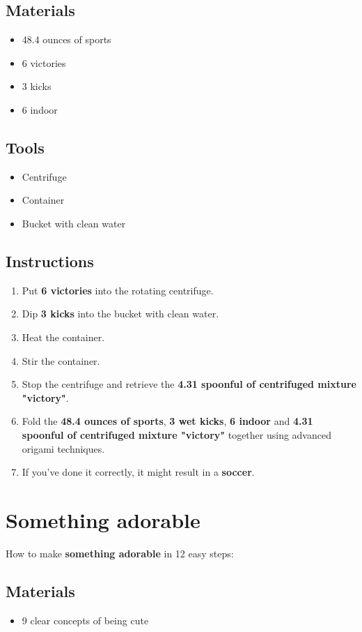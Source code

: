 \documentclass{article}
\begin{document}
\subsection{Materials}\begin{itemize}
\item 
48.4 ounces of sports
\item 
6 victories
\item 
3 kicks
\item 
6 indoor
\end{itemize}
\subsection{Tools}\begin{itemize}
\item 
Centrifuge
\item 
Container
\item 
Bucket with clean water
\end{itemize}
\subsection{Instructions}\begin{enumerate}
\item 
Put \textbf{6 victories} into the rotating centrifuge.
\item 
Dip \textbf{3 kicks} into the bucket with clean water.
\item 
Heat the container.
\item 
Stir the container.
\item 
Stop the centrifuge and retrieve the \textbf{4.31 spoonful of centrifuged mixture "victory"}.
\item 
Fold the \textbf{48.4 ounces of sports}, \textbf{3 wet kicks}, \textbf{6 indoor} and \textbf{4.31 spoonful of centrifuged mixture "victory"} together using advanced origami techniques.
\item 
If you've done it correctly, it might result in a \textbf{soccer}.
\end{enumerate}
\newpage
\section{Something adorable}How to make \textbf{something adorable} in 12 easy steps:

\subsection{Materials}\begin{itemize}
\item 
9 clear concepts of being cute
\end{itemize}
\end{document}
